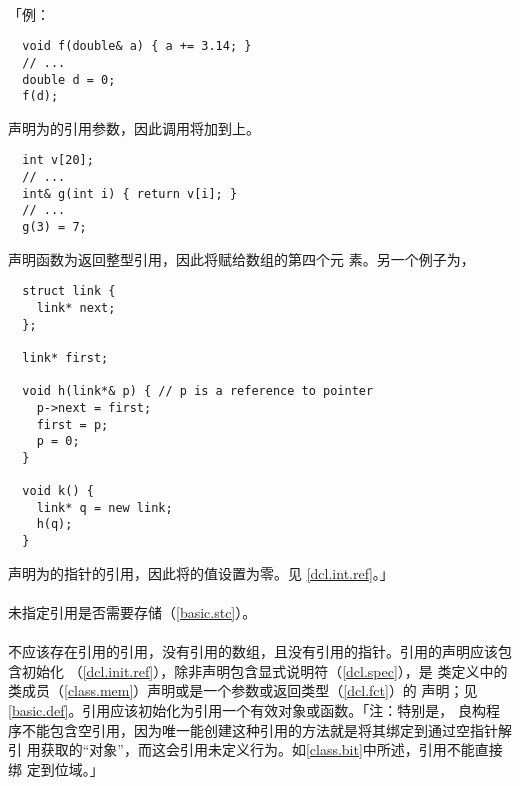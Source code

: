 \paragraph{}
「例：
\begin{lstlisting}
  void f(double& a) { a += 3.14; }
  // ...
  double d = 0;
  f(d);
\end{lstlisting}
声明为的引用参数，因此调用将加到上。
\begin{lstlisting}
  int v[20];
  // ...
  int& g(int i) { return v[i]; }
  // ...
  g(3) = 7;
\end{lstlisting}
声明函数为返回整型引用，因此将赋给数组的第四个元
素。另一个例子为，
\begin{lstlisting}
  struct link {
    link* next;
  };

  link* first;

  void h(link*& p) { // p is a reference to pointer
    p->next = first;
    first = p;
    p = 0;
  }

  void k() {
    link* q = new link;
    h(q);
  }
\end{lstlisting}
声明为的指针的引用，因此将的值设置为零。见
\ref{dcl.int.ref}。」

\paragraph{}
未指定引用是否需要存储（\ref{basic.stc}）。

\paragraph{}
不应该存在引用的引用，没有引用的数组，且没有引用的指针。引用的声明应该包含初始化
（\ref{dcl.init.ref}），除非声明包含显式说明符（\ref{dcl.spec}），是
类定义中的类成员（\ref{class.mem}）声明或是一个参数或返回类型（\ref{dcl.fct}）的
声明；见\ref{basic.def}。引用应该初始化为引用一个有效对象或函数。「注：特别是，
良构程序不能包含空引用，因为唯一能创建这种引用的方法就是将其绑定到通过空指针解引
用获取的``对象''，而这会引用未定义行为。如\ref{class.bit}中所述，引用不能直接绑
定到位域。」

